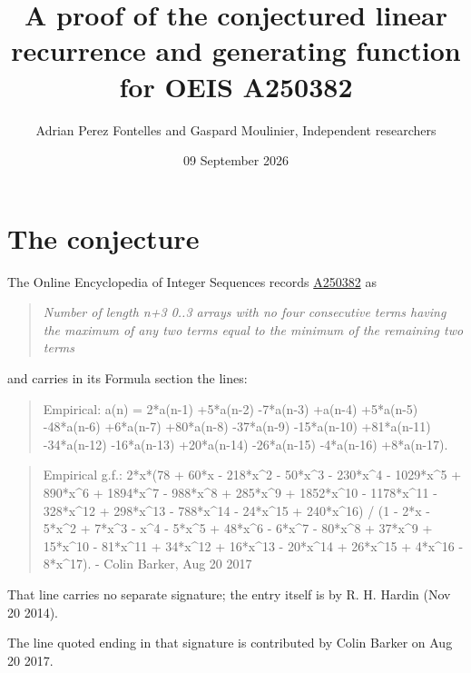 \documentclass[11pt]{article}
\title{A proof of the conjectured linear recurrence and generating function for OEIS A250382}
\author{Adrian Perez Fontelles and Gaspard Moulinier, Independent researchers}
\date{09 September 2026}
\theoremstyle{definition}
\begin{document}
\maketitle
\section{The conjecture}

The Online Encyclopedia of Integer Sequences records \href{https://oeis.org/A250382}{A250382} as

\begin{quote}\itshape Number of length n+3 0..3 arrays with no four consecutive terms having the maximum of any two terms equal to the minimum of the remaining two terms\end{quote}

and carries in its Formula section the lines:

\begin{quote}\ttfamily Empirical: a(n) = 2*a(n-1) +5*a(n-2) -7*a(n-3) +a(n-4) +5*a(n-5) -48*a(n-6) +6*a(n-7) +80*a(n-8) -37*a(n-9) -15*a(n-10) +81*a(n-11) -34*a(n-12) -16*a(n-13) +20*a(n-14) -26*a(n-15) -4*a(n-16) +8*a(n-17).\end{quote}

\begin{quote}\ttfamily Empirical g.f.: 2*x*(78 + 60*x - 218*x\textasciicircum{}2 - 50*x\textasciicircum{}3 - 230*x\textasciicircum{}4 - 1029*x\textasciicircum{}5 + 890*x\textasciicircum{}6 + 1894*x\textasciicircum{}7 - 988*x\textasciicircum{}8 + 285*x\textasciicircum{}9 + 1852*x\textasciicircum{}10 - 1178*x\textasciicircum{}11 - 328*x\textasciicircum{}12 + 298*x\textasciicircum{}13 - 788*x\textasciicircum{}14 - 24*x\textasciicircum{}15 + 240*x\textasciicircum{}16) / (1 - 2*x - 5*x\textasciicircum{}2 + 7*x\textasciicircum{}3 - x\textasciicircum{}4 - 5*x\textasciicircum{}5 + 48*x\textasciicircum{}6 - 6*x\textasciicircum{}7 - 80*x\textasciicircum{}8 + 37*x\textasciicircum{}9 + 15*x\textasciicircum{}10 - 81*x\textasciicircum{}11 + 34*x\textasciicircum{}12 + 16*x\textasciicircum{}13 - 20*x\textasciicircum{}14 + 26*x\textasciicircum{}15 + 4*x\textasciicircum{}16 - 8*x\textasciicircum{}17). - Colin Barker, Aug 20 2017\end{quote}

That line carries no separate signature; the entry itself is by R. H. Hardin (Nov 20 2014).

The line quoted ending in that signature is contributed by Colin Barker on Aug 20 2017.
\end{document}
